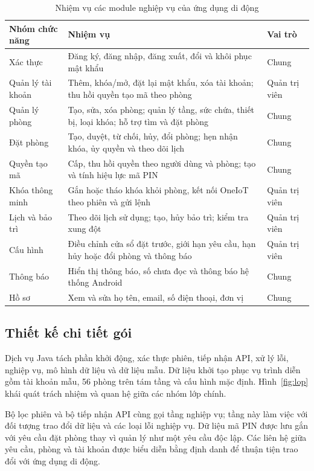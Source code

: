 \documentclass[../DoAn.tex]{subfiles}
\begin{document}
\begin{table}[H]
\centering\small
\renewcommand{\arraystretch}{1.15}
\caption{Nhiệm vụ các module nghiệp vụ của ứng dụng di động}
\label{tab:module}
\begin{tabularx}{\textwidth}{|p{3.6cm}|X|p{1.9cm}|}
\hline
\textbf{Nhóm chức năng} & \textbf{Nhiệm vụ} & \textbf{Vai trò} \\ \hline
Xác thực & Đăng ký, đăng nhập, đăng xuất, đổi và khôi phục mật khẩu & Chung \\ \hline
Quản lý tài khoản & Thêm, khóa/mở, đặt lại mật khẩu, xóa tài khoản; thu hồi quyền tạo mã theo phòng & Quản trị viên \\ \hline
Quản lý phòng & Tạo, sửa, xóa phòng; quản lý tầng, sức chứa, thiết bị, loại khóa; hỗ trợ tìm và đặt phòng & Chung \\ \hline
Đặt phòng & Tạo, duyệt, từ chối, hủy, đổi phòng; hẹn nhận khóa, ủy quyền và theo dõi lịch & Chung \\ \hline
Quyền tạo mã & Cấp, thu hồi quyền theo người dùng và phòng; tạo và tính hiệu lực mã PIN & Chung \\ \hline
Khóa thông minh & Gắn hoặc tháo khóa khỏi phòng, kết nối OneIoT theo phiên và gửi lệnh & Quản trị viên \\ \hline
Lịch và bảo trì & Theo dõi lịch sử dụng; tạo, hủy bảo trì; kiểm tra xung đột & Quản trị viên \\ \hline
Cấu hình & Điều chỉnh cửa sổ đặt trước, giới hạn yêu cầu, hạn hủy hoặc đổi phòng và thông báo & Quản trị viên \\ \hline
Thông báo & Hiển thị thông báo, số chưa đọc và thông báo hệ thống Android & Chung \\ \hline
Hồ sơ & Xem và sửa họ tên, email, số điện thoại, đơn vị & Chung \\ \hline
\end{tabularx}
\end{table}

\subsection{Thiết kế chi tiết gói}
Dịch vụ Java tách phần khởi động, xác thực phiên, tiếp nhận API, xử lý lỗi, nghiệp vụ, mô hình dữ liệu và dữ liệu mẫu. Dữ liệu khởi tạo phục vụ trình diễn gồm tài khoản mẫu, 56 phòng trên tám tầng và cấu hình mặc định. Hình~\ref{fig:lop} khái quát trách nhiệm và quan hệ giữa các nhóm lớp chính.

Bộ lọc phiên và bộ tiếp nhận API cùng gọi tầng nghiệp vụ; tầng này làm việc với đối tượng trao đổi dữ liệu và các loại lỗi nghiệp vụ. Dữ liệu mã PIN được lưu gắn với yêu cầu đặt phòng thay vì quản lý như một yêu cầu độc lập. Các liên hệ giữa yêu cầu, phòng và tài khoản được biểu diễn bằng định danh để thuận tiện trao đổi với ứng dụng di động.
\end{document}
